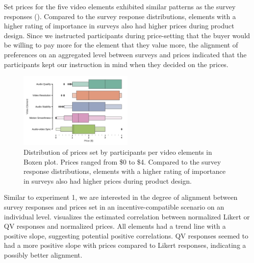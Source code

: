 Set prices for the five video elements exhibited similar patterns as the survey responses (). Compared to the survey response distributions, elements with a higher rating of importance in surveys also had higher prices during product design. Since we instructed participants during price-setting that the buyer would be willing to pay more for the element that they value more, the alignment of preferences on an aggregated level between surveys and prices indicated that the participants kept our instruction in mind when they decided on the prices.

\begin{figure}[htpb]
    \centering
    \includegraphics[width=0.5\textwidth, keepaspectratio=true]{content/image/price_distribution_per_element.pdf}
    \caption{
      Distribution of prices set by participants per video elements in Boxen plot. 
      Prices ranged from \$0 to \$4. Compared to the survey response distributions, elements with a higher rating of importance in surveys also had higher prices during product design.
    }
    \label{fig:price_exp2}
\end{figure}

Similar to experiment 1, we are interested in the degree of alignment between survey responses and prices set in an incentive-compatible scenario on an individual level.  visualizes the estimated correlation between normalized Likert or QV responses and normalized prices. All elements had a trend line with a positive slope, suggesting potential positive correlations. QV responses seemed to had a more positive slope with prices compared to Likert responses, indicating a possibly better alignment.

